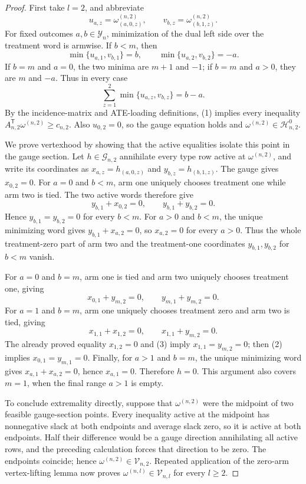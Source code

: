 \documentclass{article}
\begin{document}
\begin{proof}
First take \(l=2\), and abbreviate
\[u_{a,z}=\omega^{(n,2)}_{(a,0,z)},\qquad v_{b,z}=\omega^{(n,2)}_{(b,1,z)}.\]
For fixed outcomes \(a,b\in\mathcal Y_n\), minimization of the dual left side over the treatment word is armwise. If \(b<m\), then
\[\min\{u_{a,1},v_{b,1}\}=b,\qquad \min\{u_{a,2},v_{b,2}\}=-a.\]
If \(b=m\) and \(a=0\), the two minima are \(m+1\) and \(-1\); if \(b=m\) and \(a>0\), they are \(m\) and \(-a\). Thus in every case
\[\sum_{z=1}^2\min\{u_{a,z},v_{b,z}\}=b-a.\tag{1}\]
By the incidence-matrix and ATE-loading definitions, (1) implies every inequality \(A_{n,2}^{\mathsf T}\omega^{(n,2)}\ge c_{n,2}\). Also \(u_{0,2}=0\), so the gauge equation holds and \(\omega^{(n,2)}\in\mathcal H^0_{n,2}\).

We prove vertexhood by showing that the active equalities isolate this point in the gauge section. Let \(h\in\mathcal G_{n,2}\) annihilate every type row active at \(\omega^{(n,2)}\), and write its coordinates as \(x_{a,z}=h_{(a,0,z)}\) and \(y_{b,z}=h_{(b,1,z)}\). The gauge gives \(x_{0,2}=0\). For \(a=0\) and \(b<m\), arm one uniquely chooses treatment one while arm two is tied. The two active words therefore give
\[y_{b,1}+x_{0,2}=0,\qquad y_{b,1}+y_{b,2}=0.\]
Hence \(y_{b,1}=y_{b,2}=0\) for every \(b<m\). For \(a>0\) and \(b<m\), the unique minimizing word gives \(y_{b,1}+x_{a,2}=0\), so \(x_{a,2}=0\) for every \(a>0\). Thus the whole treatment-zero part of arm two and the treatment-one coordinates \(y_{b,1},y_{b,2}\) for \(b<m\) vanish.

For \(a=0\) and \(b=m\), arm one is tied and arm two uniquely chooses treatment one, giving
\[x_{0,1}+y_{m,2}=0,\qquad y_{m,1}+y_{m,2}=0.\tag{2}\]
For \(a=1\) and \(b=m\), arm one uniquely chooses treatment zero and arm two is tied, giving
\[x_{1,1}+x_{1,2}=0,\qquad x_{1,1}+y_{m,2}=0.\tag{3}\]
The already proved equality \(x_{1,2}=0\) and (3) imply \(x_{1,1}=y_{m,2}=0\); then (2) implies \(x_{0,1}=y_{m,1}=0\). Finally, for \(a>1\) and \(b=m\), the unique minimizing word gives \(x_{a,1}+x_{a,2}=0\), hence \(x_{a,1}=0\). Therefore \(h=0\). This argument also covers \(m=1\), when the final range \(a>1\) is empty.

To conclude extremality directly, suppose that \(\omega^{(n,2)}\) were the midpoint of two feasible gauge-section points. Every inequality active at the midpoint has nonnegative slack at both endpoints and average slack zero, so it is active at both endpoints. Half their difference would be a gauge direction annihilating all active rows, and the preceding calculation forces that direction to be zero. The endpoints coincide; hence \(\omega^{(n,2)}\in\mathcal V_{n,2}\). Repeated application of the zero-arm vertex-lifting lemma now proves \(\omega^{(n,l)}\in\mathcal V_{n,l}\) for every \(l\ge2\).


\end{proof}
\end{document}
